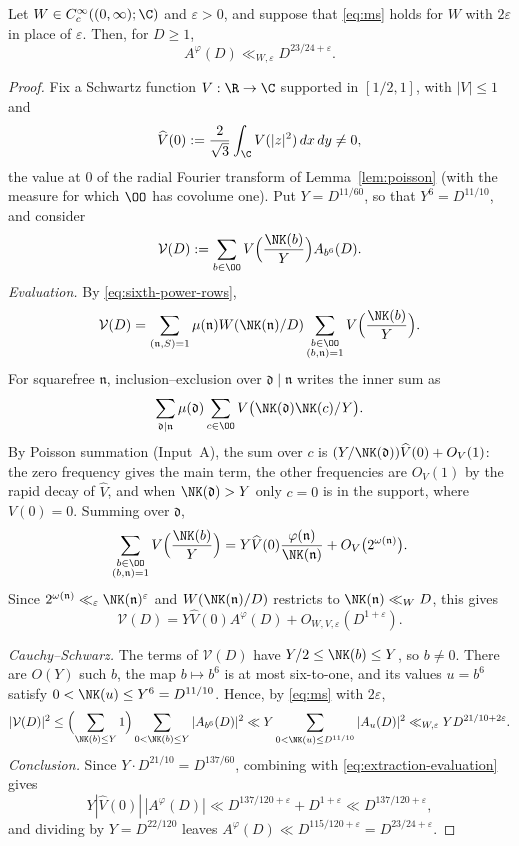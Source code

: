 \begin{proposition}\label{prop:extraction}
Let $W\in C_c^\infty((0,\infty);\C)$ and $\varepsilon>0$, and suppose that \eqref{eq:ms}
holds for $W$ with $2\varepsilon$ in place of $\varepsilon$. Then, for $D\ge1$,
\[
 A^\varphi(D)\ll_{W,\varepsilon}D^{23/24+\varepsilon}.
\]
\end{proposition}

\begin{proof}
Fix a Schwartz function $V:\R\to\C$ supported in $[1/2,1]$, with $|V|\le1$ and
\[
 \widehat V(0):=\frac2{\sqrt3}\int_{\C}V(|z|^2)\,dx\,dy\ne0 ,
\]
the value at $0$ of the radial Fourier transform of Lemma~\ref{lem:poisson} (with the measure
for which $\OO$ has covolume one). Put $Y=D^{11/60}$, so that $Y^6=D^{11/10}$, and consider
\[
 \mathcal V(D):=\sum_{b\in\OO}V\Bigl(\frac{\NK(b)}Y\Bigr)A_{b^6}(D).
\]
\emph{Evaluation.} By \eqref{eq:sixth-power-rows},
\[
 \mathcal V(D)=\sum_{(\mathfrak n,S)=1}\mu(\mathfrak n)W(\NK(\mathfrak n)/D)
 \sum_{\substack{b\in\OO\\(b,\mathfrak n)=1}}V\Bigl(\frac{\NK(b)}Y\Bigr).
\]
For squarefree $\mathfrak n$, inclusion--exclusion over $\mathfrak d\mid\mathfrak n$ writes the
inner sum as
\[
 \sum_{\mathfrak d\mid\mathfrak n}\mu(\mathfrak d)\sum_{c\in\OO}V\bigl(\NK(\mathfrak d)\NK(c)/Y\bigr).
\]
By Poisson summation (Input~A), the sum over $c$ is
$(Y/\NK(\mathfrak d))\widehat V(0)+O_V(1)$: the zero frequency gives the main term, the other
frequencies are $O_V(1)$ by the rapid decay of $\widehat V$, and when $\NK(\mathfrak d)>Y$ only
$c=0$ is in the support, where $V(0)=0$. Summing over $\mathfrak d$,
\[
 \sum_{\substack{b\in\OO\\(b,\mathfrak n)=1}}V\Bigl(\frac{\NK(b)}Y\Bigr)
 =Y\widehat V(0)\frac{\varphi(\mathfrak n)}{\NK(\mathfrak n)}+O_V\bigl(2^{\omega(\mathfrak n)}\bigr).
\]
Since $2^{\omega(\mathfrak n)}\ll_\varepsilon\NK(\mathfrak n)^\varepsilon$ and $W(\NK(\mathfrak n)/D)$
restricts to $\NK(\mathfrak n)\ll_W D$, this gives
\begin{equation}\label{eq:extraction-evaluation}
 \mathcal V(D)=Y\widehat V(0)A^\varphi(D)+O_{W,V,\varepsilon}(D^{1+\varepsilon}).
\end{equation}

\emph{Cauchy--Schwarz.} The terms of $\mathcal V(D)$ have $Y/2\le\NK(b)\le Y$, so $b\ne0$. There are $O(Y)$ such $b$,
the map $b\mapsto b^6$ is at most six-to-one, and its values $u=b^6$ satisfy
$0<\NK(u)\le Y^6=D^{11/10}$. Hence, by \eqref{eq:ms} with $2\varepsilon$,
\[
 |\mathcal V(D)|^2\le\Bigl(\sum_{\NK(b)\le Y}1\Bigr)\sum_{0<\NK(b)\le Y}|A_{b^6}(D)|^2
 \ll Y\sum_{0<\NK(u)\le D^{11/10}}|A_u(D)|^2
 \ll_{W,\varepsilon}Y D^{21/10+2\varepsilon}.
\]
\emph{Conclusion.} Since $Y\cdot D^{21/10}=D^{137/60}$, combining with
\eqref{eq:extraction-evaluation} gives
\[
 Y|\widehat V(0)|\,|A^\varphi(D)|\ll D^{137/120+\varepsilon}+D^{1+\varepsilon}
 \ll D^{137/120+\varepsilon},
\]
and dividing by $Y=D^{22/120}$ leaves $A^\varphi(D)\ll D^{115/120+\varepsilon}=D^{23/24+\varepsilon}$.
\end{proof}

